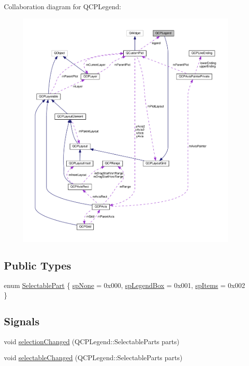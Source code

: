 Collaboration diagram for Q\+C\+P\+Legend\+:
\nopagebreak
\begin{figure}[H]
\begin{center}
\leavevmode
\includegraphics[width=350pt]{classQCPLegend__coll__graph}
\end{center}
\end{figure}
\subsection*{Public Types}
\begin{DoxyCompactItemize}
\item 
enum \hyperlink{classQCPLegend_a5404de8bc1e4a994ca4ae69e2c7072f1}{Selectable\+Part} \{ \hyperlink{classQCPLegend_a5404de8bc1e4a994ca4ae69e2c7072f1a378201c07d500af7126e3ec91652eed7}{sp\+None} = 0x000, 
\hyperlink{classQCPLegend_a5404de8bc1e4a994ca4ae69e2c7072f1a0fa4758962a46fa1dc9da818abae23c4}{sp\+Legend\+Box} = 0x001, 
\hyperlink{classQCPLegend_a5404de8bc1e4a994ca4ae69e2c7072f1a768bfb95f323db4c66473375032c0af7}{sp\+Items} = 0x002
 \}
\end{DoxyCompactItemize}
\subsection*{Signals}
\begin{DoxyCompactItemize}
\item 
void \hyperlink{classQCPLegend_a82c88464edac07a9eefaf3906268df3b}{selection\+Changed} (Q\+C\+P\+Legend\+::\+Selectable\+Parts parts)
\item 
void \hyperlink{classQCPLegend_a8a77300fd0976d6bdd8000f4e8d114b8}{selectable\+Changed} (Q\+C\+P\+Legend\+::\+Selectable\+Parts parts)
\end{DoxyCompactItemize}
